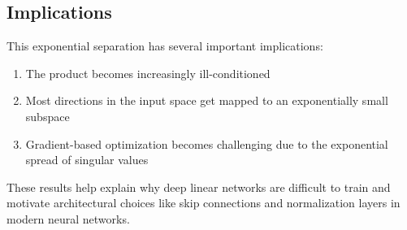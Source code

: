 \documentclass[12pt]{article}
\theoremstyle{plain}
\theoremstyle{definition}
\theoremstyle{remark}
\begin{document}
\subsection{Implications}

This exponential separation has several important implications:

\begin{enumerate}
    \item The product becomes increasingly ill-conditioned
    \item Most directions in the input space get mapped to an exponentially small subspace
    \item Gradient-based optimization becomes challenging due to the exponential spread of singular values
\end{enumerate}

These results help explain why deep linear networks are difficult to train and motivate architectural choices like skip connections and normalization layers in modern neural networks.
\end{document}
